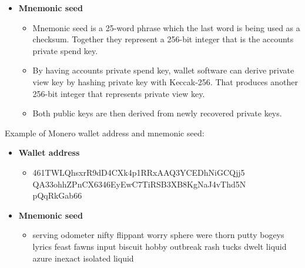\documentclass[
  printed, %
  table,   %
  nolof,     %
  nolot,     %
           oneside, color
]{fithesis3}
\begin{document}
\begin{itemize}
\begin{itemize}
\end{itemize}
\item \textbf{Mnemonic seed}
\begin{itemize}\itemsep0em
\item Mnemonic seed is a 25-word phrase which the last word is being used as a checksum. Together they represent a 256-bit integer that is the accounts private spend key.
\item By having accounts private spend key, wallet software can derive private view key by hashing private key with Keccak-256. That produces another 256-bit integer that represents private view key.
\item Both public keys are then derived from newly recovered private keys.
\end{itemize}
\end{itemize}
Example of Monero wallet address and mnemonic seed:
\begin{itemize}\itemsep0em
\item \textbf{Wallet address}
\begin{itemize}\itemsep0em
\item 461TWLQhsxrR9dD4CXk4p1RRxAAQ3YCEDhNiGCQjj5\\QA33ohhZPnCX6346EyEwC7TiRSB3XB8KgNaJ4vThd5N\\pQqRkGab66
\end{itemize}
\item \textbf{Mnemonic seed}
\begin{itemize}\itemsep0em
\item serving odometer nifty flippant worry sphere were thorn putty bogeys lyrics feast fawns input biscuit hobby outbreak rash tucks dwelt liquid azure inexact isolated liquid
\end{itemize}
\end{itemize}
\end{document}
